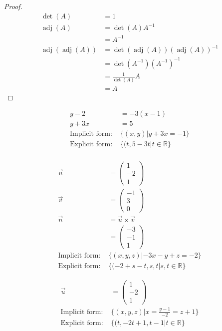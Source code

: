 \documentclass[12pt]{article}
\newenvironment{problem}[2][Problem]{\begin{trivlist}
\item[\hskip \labelsep {\bfseries #1}\hskip \labelsep {\bfseries #2.}]}{\end{trivlist}}
\begin{document}
\begin{problem}{4.b}
\end{problem}
\begin{proof}
\begin{align*}
\det(A) &= 1\\
\operatorname{adj}(A) &= \det(A) A^{-1}\\
& = A^{-1}\\
\operatorname{adj}(\operatorname{adj}(A)) &= \det(\operatorname{adj}(A)) (\operatorname{adj}(A))^{-1}\\
&= \det(A^{-1}) (A^{-1})^{-1}\\
&= \frac{1}{\det(A)} A\\
&= A
\end{align*}
\end{proof}

\begin{problem}{5.a}
\end{problem}
\begin{align*}
y - 2 &= -3(x-1)\\
y + 3x &= 5\\
\text{Implicit form: } &\{ (x,y) | y + 3x = -1 \}\\
\text{Explicit form: } &\{ (t, 5-3t | t \in \mathbb{R} \}\\
\end{align*}

\begin{problem}{5.b}
\end{problem}
\begin{align*}
\vec u &= \left( \begin{array}{c}
	1 \\ -2 \\ 1
	\end{array}
	\right)\\
\vec v &= \left( \begin{array}{c}
	-1 \\ 3 \\ 0
	\end{array}
	\right)\\
\vec n &= \vec u \times \vec v \\
&= \left( \begin{array}{c}
	-3 \\ -1 \\ 1
	\end{array}
	\right)\\
\text{Implicit form: } &\{ (x,y,z) | -3x -y + z = -2 \}\\
\text{Explicit form: } &\{ (-2 +s-t, s, t | s,t \in \mathbb{R} \}
\end{align*}

\begin{problem}{5.c}
\end{problem}
\begin{align*}
\vec u &= \left( \begin{array}{c}
	1 \\ -2 \\ 1
	\end{array}
	\right)\\
\text{Implicit form: } &\{ (x,y,z) | x = \frac{y - 1}{-2} = z + 1 \}\\
\text{Explicit form: } &\{ (t, -2t + 1, t - 1 | t \in \mathbb{R} \}
\end{align*}
\end{document}
